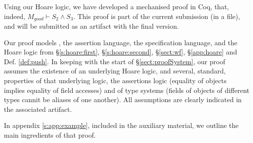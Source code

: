 Using our Hoare logic, we have developed a mechanised proof in Coq, that, indeed, $M_{good} \vdash S_2 \wedge S_3$.
This proof is part of the current submission (in a  file), and will be submitted as an artifact with the final version.

Our proof models  \LangOO, the assertion language, the specification language, and the Hoare logic from \S \ref{s:hoare:first},  \S   \ref{s:hoare:second},  \S  \ref{sect:wf},  \S \ref{app:hoare} and Def. \ref{def:push}.
In keeping with   the start of  \S \ref{sect:proofSystem}, our proof assumes the existence of an underlying Hoare logic,  
and several, standard, properties of that underlying logic, the assertions logic (\eg equality of objects implies equality of field accesses) and of type systems
(\eg  fields of objects of different types cannit be aliases of one another).
All assumptions  are clearly indicated in the associated artifact.

%

In appendix \ref{s:app:example}, included in the auxiliary material, we outline the main ingredients of that proof. 

